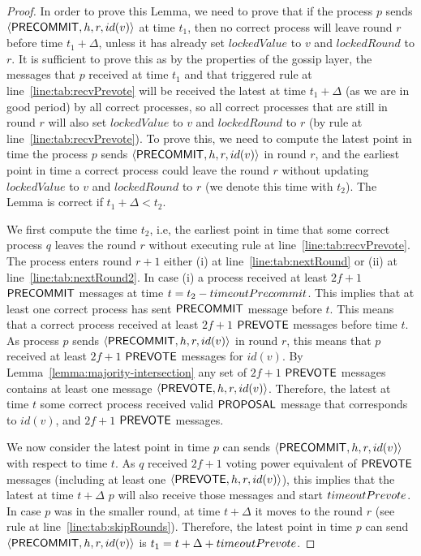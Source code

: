 \begin{proof}
In order to prove this Lemma, we need to prove that if the process $p$ sends $\langle\mathsf{PRECOMMIT},h,r,id(v)\rangle$ at time $t_1$, then no correct process will leave round $r$ before time $t_1 + \Delta$, unless it has already set $lockedValue$ to $v$ and $lockedRound$ to $r$. It is sufficient to prove this as by the properties of the gossip layer, the messages that $p$ received at time $t_1$ and that triggered rule at line~\ref{line:tab:recvPrevote} will be received the latest at time $t_1 + \Delta$ (as we are in good period) by all correct processes, so all correct processes that are still in round $r$ will also set $lockedValue$ to $v$ and $lockedRound$ to $r$ (by rule at line~\ref{line:tab:recvPrevote}). To prove this, we need to compute the latest point in time the process $p$ sends $\langle\mathsf{PRECOMMIT},h,r,id(v)\rangle$ in round $r$, and the earliest point in time a correct process could leave the round $r$ without updating $lockedValue$ to $v$ and $lockedRound$ to $r$ (we denote this time with $t_2$). The Lemma is correct if $t_1 + \Delta < t_2$. 

We first compute the time $t_2$, i.e, the earliest point in time that some correct process $q$ leaves the round $r$ without executing rule at line~\ref{line:tab:recvPrevote}. The process enters round $r+1$ either (i) at line~\ref{line:tab:nextRound} or (ii) at line~\ref{line:tab:nextRound2}.
In case (i) a process received at least $2f+1$ $\mathsf{PRECOMMIT}$ messages at time $t = t_2 - timeoutPrecommit$. This implies that at least one correct process has sent $\mathsf{PRECOMMIT}$ message before $t$. This means that a correct process received at least $2f+1$ $\mathsf{PREVOTE}$ messages before time $t$. As process $p$ sends $\langle\mathsf{PRECOMMIT},h,r,id(v)\rangle$ in round $r$, this means that $p$ received at least $2f+1$ $\mathsf{PREVOTE}$ messages for $id(v)$. By Lemma~\ref{lemma:majority-intersection} any set of $2f+1$ $\mathsf{PREVOTE}$ messages contains at least one message $\langle\mathsf{PREVOTE},h,r,id(v)\rangle$.
Therefore, the latest at time $t$ some correct process received valid $\mathsf{PROPOSAL}$ message that corresponds to $id(v)$, and $2f+1$ $\mathsf{PREVOTE}$
messages.  

We now consider the latest point in time $p$ can sends $\langle\mathsf{PRECOMMIT},h,r,id(v)\rangle$ with respect to time $t$. As $q$ received $2f+1$ voting power equivalent of $\mathsf{PREVOTE}$ messages (including at least one $\langle\mathsf{PREVOTE},h,r,id(v)\rangle$), this implies that the latest at time $t+\Delta$ $p$ will also receive those messages and start $timeoutPrevote$. In case $p$ was in the smaller round, at time $t + \Delta$ it moves to the round $r$ (see rule at line~\ref{line:tab:skipRounds}). Therefore, the latest point in time $p$ can send $\langle\mathsf{PRECOMMIT},h,r,id(v)\rangle$ is $t_1 = t + \Delta + timeoutPrevote$.   


\end{proof}
